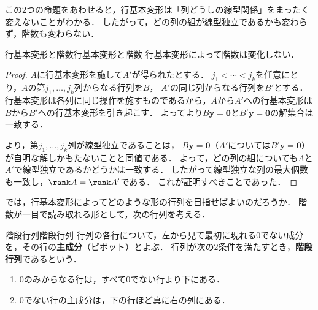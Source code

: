 この$2$つの命題をあわせると，行基本変形は「列どうしの線型関係」をまったく変えないことがわかる．
したがって，どの列の組が線型独立であるかも変わらず，階数も変わらない．

\begin{theorem}{行基本変形と階数}{行基本変形と階数}
  行基本変形によって階数は変化しない．
\end{theorem}

\begin{tleftbar}
\begin{proof}
  $A$に行基本変形を施して$A'$が得られたとする．
  $j_1 < \cdots < j_k$を任意にとり，$A$の第$j_1, \dots, j_k$列からなる行列を$B$，
  $A'$の同じ列からなる行列を$B'$とする．
  行基本変形は各列に同じ操作を施すものであるから，$A$から$A'$への行基本変形は$B$から$B'$への行基本変形を引き起こす．
  よってより$B\bm{y} = \bm{0}$と$B'\bm{y} = \bm{0}$の解集合は一致する．

  より，第$j_1, \dots, j_k$列が線型独立であることは，
  $B\bm{y} = \bm{0}$（$A'$については$B'\bm{y} = \bm{0}$）が自明な解しかもたないことと同値である．
  よって，どの列の組についても$A$と$A'$で線型独立であるかどうかは一致する．
  したがって線型独立な列の最大個数も一致し，$\rank A = \rank A'$である．
  これが証明すべきことであった．
\end{proof}
\end{tleftbar}

では，行基本変形によってどのような形の行列を目指せばよいのだろうか．
階数が一目で読み取れる形として，次の行列を考える．

\begin{definition}{階段行列}{階段行列}
  行列の各行について，左から見て最初に現れる$0$でない成分を，その行の\textbf{主成分}（ピボット）とよぶ．
  行列が次の$2$条件を満たすとき，\textbf{階段行列}であるという．
  \begin{enumerate}[label=(\roman*),leftmargin=3.2em]
    \item $0$のみからなる行は，すべて$0$でない行より下にある．
    \item $0$でない行の主成分は，下の行ほど真に右の列にある．
  \end{enumerate}
\end{definition}

